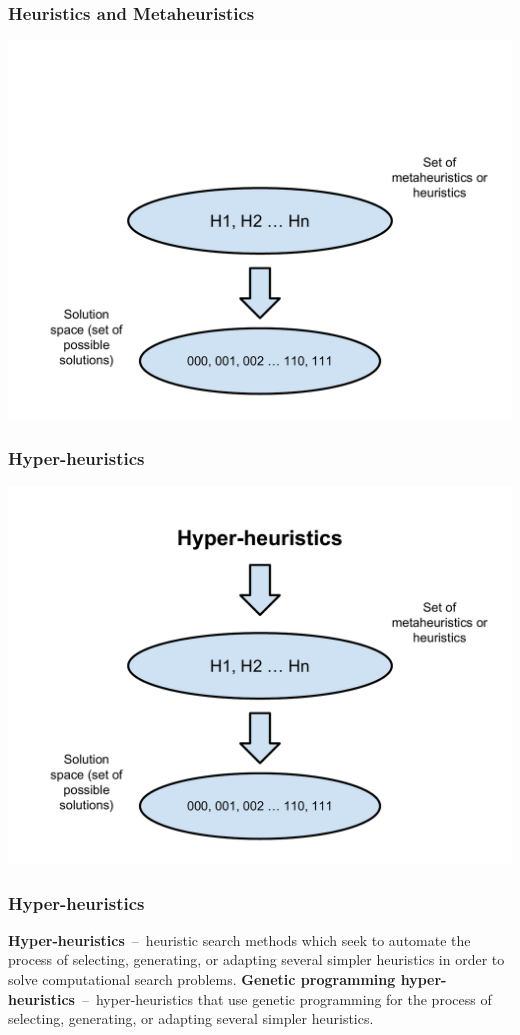 \documentclass{beamer}
\newcommand{\linespace}{\vskip 0.25cm}
\begin{document}
\begin{frame}
	\frametitle{Heuristics and Metaheuristics}
	\includegraphics[height=.9\textheight]{Illustrations/heuristic_1.PDF}
\end{frame}

\begin{frame}
	\frametitle{Hyper-heuristics}
	\includegraphics[height=.9\textheight]{Illustrations/heuristic_2.PDF}
\end{frame}

\begin{frame}
	\frametitle{Hyper-heuristics}
	\textbf{Hyper-heuristics}~--~heuristic search methods which seek to automate the process of selecting, generating, or adapting several simpler heuristics in order to solve computational search problems.
	\linespace
	\pause
	\textbf{Genetic programming hyper-heuristics}~--~hyper-heuristics that use genetic programming for the process of selecting, generating, or adapting several simpler heuristics.
\end{frame}
\end{document}
